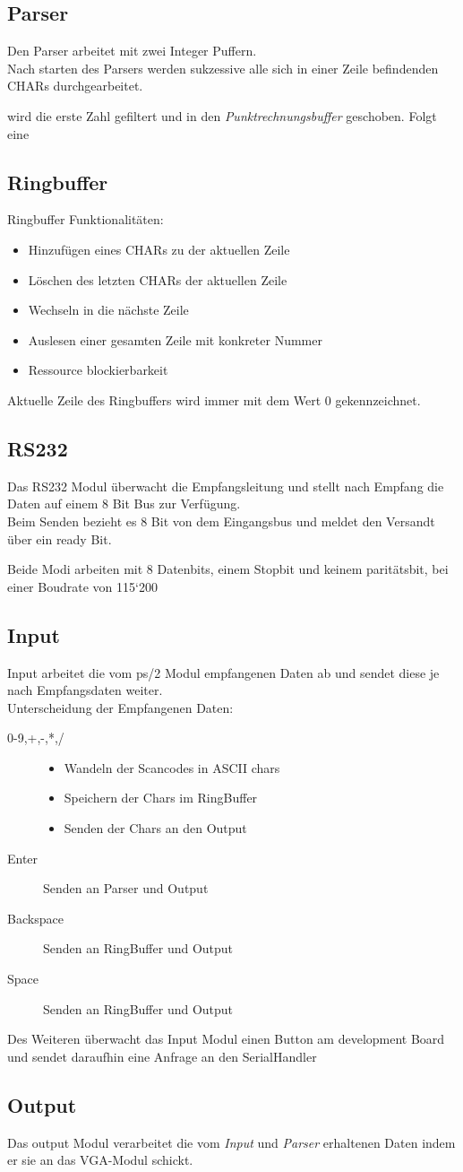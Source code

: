 \subsection{Parser}
Den Parser arbeitet mit zwei Integer Puffern. \\
Nach starten des Parsers werden sukzessive alle sich in einer Zeile befindenden CHARs durchgearbeitet.

wird die erste Zahl gefiltert und in den \textit{Punktrechnungsbuffer} geschoben.
Folgt eine
\subsection{Ringbuffer}
Ringbuffer Funktionalitäten:
\begin{itemize}
 \item Hinzufügen eines CHARs zu der aktuellen Zeile
 \item Löschen des letzten CHARs der aktuellen Zeile
 \item Wechseln in die nächste Zeile
 \item Auslesen einer gesamten Zeile mit konkreter Nummer
 \item Ressource blockierbarkeit
\end{itemize}
Aktuelle Zeile des Ringbuffers wird immer mit dem Wert 0 gekennzeichnet.

\subsection{RS232}
Das RS232 Modul überwacht die Empfangsleitung und stellt nach Empfang die Daten auf einem 
8 Bit Bus zur Verfügung.\\
Beim Senden bezieht es 8 Bit von dem Eingangsbus und meldet den Versandt über ein ready Bit.

Beide Modi arbeiten mit 8 Datenbits, einem Stopbit und keinem paritätsbit, bei einer
Boudrate von 115`200
\subsection{Input}
Input arbeitet die vom ps/2 Modul empfangenen Daten ab und sendet diese je nach Empfangsdaten weiter.\\
Unterscheidung der Empfangenen Daten:
\begin{description}
 \item[0-9,+,-,*,/] 
	\begin{itemize}
		\item Wandeln der Scancodes in ASCII chars 
		\item Speichern der Chars im RingBuffer
		\item Senden der Chars an den Output
	\end{itemize}
 \item[Enter] Senden an Parser und Output
 \item[Backspace] Senden an RingBuffer und Output
 \item[Space] Senden an RingBuffer und Output
 \end{description}

Des Weiteren überwacht das Input Modul einen Button am development Board und sendet
daraufhin eine Anfrage an den SerialHandler
\subsection{Output}
Das output Modul verarbeitet die vom \textit{Input} und \textit{Parser} erhaltenen Daten indem er sie an das VGA-Modul schickt.